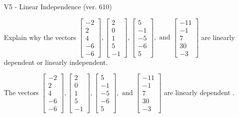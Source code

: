 \begin{exercise}
  \begin{exerciseTitle}V5 - Linear Independence (ver. 610)\end{exerciseTitle}
  \begin{exerciseStatement}
    Explain why the vectors \(\left[\begin{array}{r}
-2 \\
2 \\
4 \\
-6 \\
-6
\end{array}\right] , \left[\begin{array}{r}
2 \\
0 \\
1 \\
5 \\
-1
\end{array}\right] , \left[\begin{array}{r}
5 \\
-1 \\
-5 \\
-6 \\
5
\end{array}\right] , \text{ and } \left[\begin{array}{r}
-11 \\
-1 \\
7 \\
30 \\
-3
\end{array}\right]\) are linearly dependent or linearly independent.	


  \end{exerciseStatement}
  \begin{exerciseAnswer}
   The vectors \(\left[\begin{array}{r}
-2 \\
2 \\
4 \\
-6 \\
-6
\end{array}\right] , \left[\begin{array}{r}
2 \\
0 \\
1 \\
5 \\
-1
\end{array}\right] , \left[\begin{array}{r}
5 \\
-1 \\
-5 \\
-6 \\
5
\end{array}\right] , \text{ and } \left[\begin{array}{r}
-11 \\
-1 \\
7 \\
30 \\
-3
\end{array}\right]\) are 
  	 linearly dependent  .
  


  \end{exerciseAnswer}
\end{exercise}